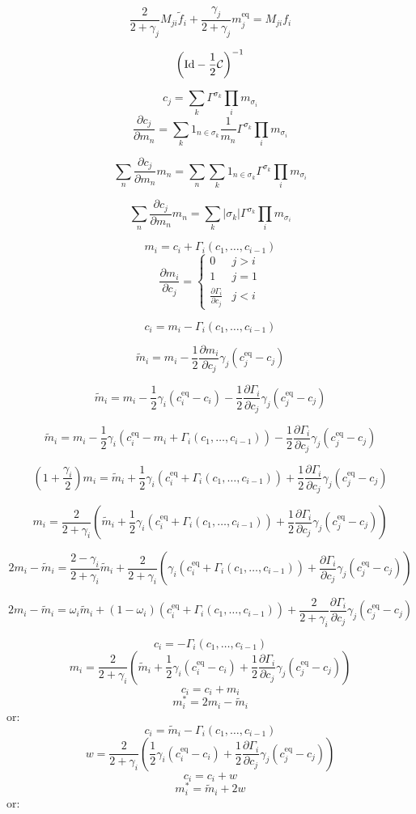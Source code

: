 \documentclass{article}
\newcommand{\rr}[2]{\frac{\partial #1}{\partial #2}}
\newcommand{\eq}{\text{eq}}
\newcommand{\f}{\tilde{f}}
\newcommand{\m}{\tilde{m}}
\begin{document}
\[\frac{2}{2+\gamma_j}M_{ji}\f_i + \frac{\gamma_j}{2+\gamma_j}m^\eq_j = M_{ji}f_i\]


\newpage

\[\left(\text{Id} - \frac{1}{2}\mathcal{C}\right)^{-1}\]

\newpage

\[c_j = \sum_k \Gamma^{\sigma_k}\prod_i m_{\sigma_i}\]
\[\rr{c_j}{m_n} = \sum_k 1_{n\in\sigma_k}\frac{1}{m_n}\Gamma^{\sigma_k}\prod_i m_{\sigma_i}\]

\[\sum_n\rr{c_j}{m_n}m_n = \sum_n\sum_k 1_{n\in\sigma_k}\Gamma^{\sigma_k}\prod_i m_{\sigma_i}\]

\[\sum_n\rr{c_j}{m_n}m_n = \sum_k |\sigma_k|\Gamma^{\sigma_k}\prod_i m_{\sigma_i}\]



\newpage


\[m_i = c_i + \Gamma_i(c_1,\ldots,c_{i-1})\]
\[\rr{m_i}{c_j} = \begin{cases}
0 & j > i\\
1 & j = 1\\
\rr{\Gamma_i}{c_j} & j < i
\end{cases}\]

\[c_i = m_i - \Gamma_i(c_1,\ldots,c_{i-1})\]


\[\m_i = m_i - \frac{1}{2}\rr{m_i}{c_j}\gamma_j(c^\eq_j-c_j)\]

\[\m_i = m_i - \frac{1}{2}\gamma_i(c^\eq_i-c_i) - \frac{1}{2}\rr{\Gamma_i}{c_j}\gamma_j(c^\eq_j-c_j)\]

\[\m_i = m_i - \frac{1}{2}\gamma_i(c^\eq_i-m_i + \Gamma_i(c_1,\ldots,c_{i-1})) - \frac{1}{2}\rr{\Gamma_i}{c_j}\gamma_j(c^\eq_j-c_j)\]


\[(1+\frac{\gamma_i}{2}) m_i = \m_i + \frac{1}{2}\gamma_i(c^\eq_i + \Gamma_i(c_1,\ldots,c_{i-1})) + \frac{1}{2}\rr{\Gamma_i}{c_j}\gamma_j(c^\eq_j-c_j)\]

\[m_i = \frac{2}{2+\gamma_i}\left(\m_i + \frac{1}{2}\gamma_i(c^\eq_i + \Gamma_i(c_1,\ldots,c_{i-1})) + \frac{1}{2}\rr{\Gamma_i}{c_j}\gamma_j(c^\eq_j-c_j)\right)\]


\[2m_i - \m_i = \frac{2-\gamma_i}{2+\gamma_i}\m_i + \frac{2}{2+\gamma_i}\left(\gamma_i(c^\eq_i + \Gamma_i(c_1,\ldots,c_{i-1})) + \rr{\Gamma_i}{c_j}\gamma_j(c^\eq_j-c_j)\right)\]


\[2m_i - \m_i = \omega_i\m_i + (1-\omega_i)(c^\eq_i + \Gamma_i(c_1,\ldots,c_{i-1})) + \frac{2}{2+\gamma_i}\rr{\Gamma_i}{c_j}\gamma_j(c^\eq_j-c_j)\]


\newpage

\[c_i = - \Gamma_i(c_1,\ldots,c_{i-1}) \]
\[m_i = \frac{2}{2+\gamma_i}\left(\m_i + \frac{1}{2}\gamma_i(c^\eq_i - c_i) + \frac{1}{2}\rr{\Gamma_i}{c_j}\gamma_j(c^\eq_j-c_j)\right)\]
\[c_i = c_i + m_i\]
\[m_i^\ast = 2m_i - \m_i\]
or:
\[c_i = \m_i - \Gamma_i(c_1,\ldots,c_{i-1}) \]
\[w = \frac{2}{2+\gamma_i}\left(\frac{1}{2}\gamma_i(c^\eq_i - c_i) + \frac{1}{2}\rr{\Gamma_i}{c_j}\gamma_j(c^\eq_j-c_j)\right)\]
\[c_i = c_i + w\]
\[m_i^\ast = \m_i + 2w\]
or:
\end{document}
